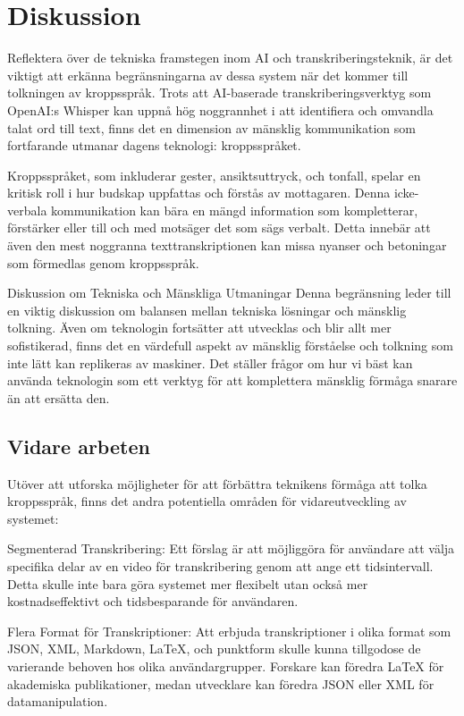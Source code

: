 \chapter{Diskussion}

Reflektera över de tekniska framstegen inom AI och transkriberingsteknik, är det viktigt att erkänna begränsningarna av dessa system när det kommer till tolkningen av kroppsspråk. Trots att AI-baserade transkriberingsverktyg som OpenAI:s Whisper kan uppnå hög noggrannhet i att identifiera och omvandla talat ord till text, finns det en dimension av mänsklig kommunikation som fortfarande utmanar dagens teknologi: kroppsspråket.

Kroppsspråket, som inkluderar gester, ansiktsuttryck, och tonfall, spelar en kritisk roll i hur budskap uppfattas och förstås av mottagaren. Denna icke-verbala kommunikation kan bära en mängd information som kompletterar, förstärker eller till och med motsäger det som sägs verbalt. Detta innebär att även den mest noggranna texttranskriptionen kan missa nyanser och betoningar som förmedlas genom kroppsspråk.

Diskussion om Tekniska och Mänskliga Utmaningar
Denna begränsning leder till en viktig diskussion om balansen mellan tekniska lösningar och mänsklig tolkning. Även om teknologin fortsätter att utvecklas och blir allt mer sofistikerad, finns det en värdefull aspekt av mänsklig förståelse och tolkning som inte lätt kan replikeras av maskiner. Det ställer frågor om hur vi bäst kan använda teknologin som ett verktyg för att komplettera mänsklig förmåga snarare än att ersätta den.

\section{Vidare arbeten}
Utöver att utforska möjligheter för att förbättra teknikens förmåga att tolka kroppsspråk, finns det andra potentiella områden för vidareutveckling av systemet:

Segmenterad Transkribering: Ett förslag är att möjliggöra för användare att välja specifika delar av en video för transkribering genom att ange ett tidsintervall. Detta skulle inte bara göra systemet mer flexibelt utan också mer kostnadseffektivt och tidsbesparande för användaren.

Flera Format för Transkriptioner: Att erbjuda transkriptioner i olika format som JSON, XML, Markdown, LaTeX, och punktform skulle kunna tillgodose de varierande behoven hos olika användargrupper. Forskare kan föredra LaTeX för akademiska publikationer, medan utvecklare kan föredra JSON eller XML för datamanipulation.

